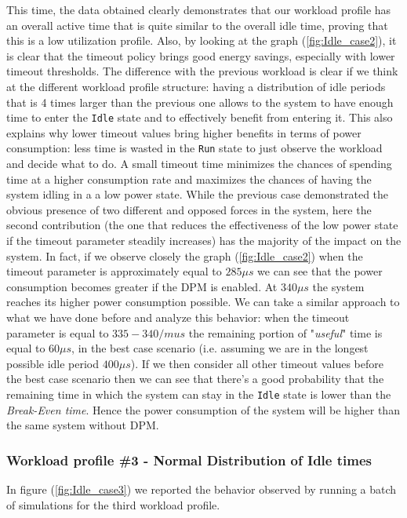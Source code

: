 \documentclass[a4paper]{article}
\begin{document}
            This time, the data obtained clearly demonstrates that our workload profile has an overall active time that is quite similar to the overall idle time, proving that this is a low utilization profile. Also, by looking at the graph (\ref{fig:Idle_case2}), it is clear that the timeout policy brings good energy savings, especially with lower timeout thresholds.
            The difference with the previous workload is clear if we think at the different workload profile structure: having a distribution of idle periods that is 4 times larger than the previous one allows to the system to have enough time to enter the \texttt{Idle} state and to effectively benefit from entering it. This also explains why lower timeout values bring higher benefits in terms of power consumption: less time is wasted in the \texttt{Run} state to just observe the workload and decide what to do. A small timeout time minimizes the chances of spending time at a higher consumption rate and maximizes the chances of having the system idling in a a low power state.
            While the previous case demonstrated the obvious presence of two different and opposed forces in the system, here the second contribution (the one that reduces the effectiveness of the low power state if the timeout parameter steadily increases) has the majority of the impact on the system.
            In fact, if we observe closely the graph (\ref{fig:Idle_case2}) when the timeout parameter is approximately equal to $285 \mu s$ we can see that the power consumption becomes greater if the DPM is enabled.
            At $340 \mu s$ the system reaches its higher power consumption possible. We can take a similar approach to what we have done before and analyze this behavior: when the timeout parameter is equal to $335-340 /mu s$ the remaining portion of "\emph{useful}" time is equal to $60 \mu s$, in the best case scenario (i.e. assuming we are in the longest possible idle period $400 \mu s$). If we then consider all other timeout values before the best case scenario then we can see that there's a good probability that the remaining time in which the system can stay in the \texttt{Idle} state is lower than the \emph{Break-Even time}. Hence the power consumption of the system will be higher than the same system without DPM.

        \subsubsection{Workload profile \#3 - Normal Distribution of Idle times}
            In figure (\ref{fig:Idle_case3}) we reported the behavior observed by running a batch of simulations for the third workload profile.
\end{document}
